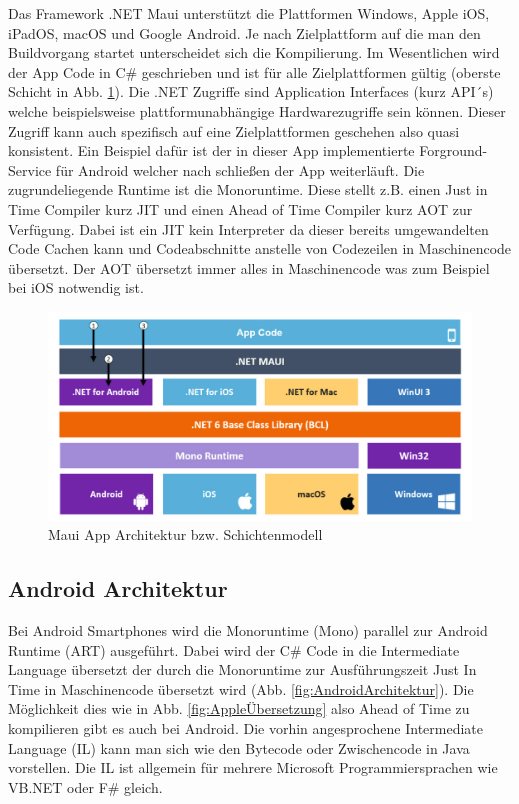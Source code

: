 Das Framework .NET Maui unterstützt die Plattformen Windows, Apple iOS, iPadOS, macOS und Google Android. Je nach Zielplattform auf die man den Buildvorgang startet unterscheidet sich die Kompilierung. Im Wesentlichen wird der App Code in C\# geschrieben und ist für alle Zielplattformen gültig (oberste Schicht in Abb. \ref{fig:MauiArchitektur}). Die .NET Zugriffe sind Application Interfaces (kurz API´s) welche beispielsweise plattformunabhängige Hardwarezugriffe sein können. Dieser Zugriff kann auch spezifisch auf eine Zielplattformen geschehen also quasi konsistent. Ein Beispiel dafür ist der in dieser App implementierte Forground-Service für Android welcher nach schließen der App weiterläuft. Die zugrundeliegende Runtime ist die Monoruntime. Diese stellt z.B. einen Just in Time Compiler kurz JIT und einen Ahead of Time Compiler kurz AOT zur Verfügung. Dabei ist ein JIT kein Interpreter da dieser bereits umgewandelten Code Cachen kann und Codeabschnitte anstelle von Codezeilen in Maschinencode übersetzt. Der AOT übersetzt immer alles in Maschinencode was zum Beispiel bei iOS notwendig ist.

\begin{figure}[H]
	\centering
	\includegraphics[width=\textwidth,height=\textheight,keepaspectratio]{figures/MauiArchitektur.png}
	\caption{Maui App Architektur bzw. Schichtenmodell}
	\label{fig:MauiArchitektur}
\end{figure}

\subsection{Android Architektur}
Bei Android Smartphones wird die Monoruntime (Mono) parallel zur Android Runtime (ART) ausgeführt. Dabei wird der C\# Code in die Intermediate Language übersetzt der durch die Monoruntime zur Ausführungszeit Just In Time in Maschinencode übersetzt wird (Abb. \ref{fig:AndroidArchitektur}). Die Möglichkeit dies wie in Abb. \ref{fig:AppleÜbersetzung} also Ahead of Time zu kompilieren gibt es auch bei Android. Die vorhin angesprochene Intermediate Language (IL) kann man sich wie den Bytecode oder Zwischencode in Java vorstellen. Die IL ist allgemein für mehrere Microsoft Programmiersprachen wie VB.NET oder F\# gleich. 
  
